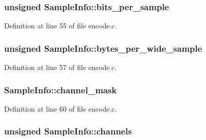 \subsubsection[{\texorpdfstring{bits\+\_\+per\+\_\+sample}{bits_per_sample}}]{\setlength{\rightskip}{0pt plus 5cm}unsigned Sample\+Info\+::bits\+\_\+per\+\_\+sample}\hypertarget{struct_sample_info_a81cea16f77d5531faa6c5ccd1f03557d}{}\label{struct_sample_info_a81cea16f77d5531faa6c5ccd1f03557d}


Definition at line 55 of file encode.\+c.

\subsubsection[{\texorpdfstring{bytes\+\_\+per\+\_\+wide\+\_\+sample}{bytes_per_wide_sample}}]{\setlength{\rightskip}{0pt plus 5cm}unsigned Sample\+Info\+::bytes\+\_\+per\+\_\+wide\+\_\+sample}\hypertarget{struct_sample_info_aa119c89d126596b5a6e1f334a5424337}{}\label{struct_sample_info_aa119c89d126596b5a6e1f334a5424337}


Definition at line 57 of file encode.\+c.

\subsubsection[{\texorpdfstring{channel\+\_\+mask}{channel_mask}}]{ Sample\+Info\+::channel\+\_\+mask}\hypertarget{struct_sample_info_ae709550399925e097e2db55005bf1220}{}\label{struct_sample_info_ae709550399925e097e2db55005bf1220}


Definition at line 60 of file encode.\+c.

\subsubsection[{\texorpdfstring{channels}{channels}}]{\setlength{\rightskip}{0pt plus 5cm}unsigned Sample\+Info\+::channels}\hypertarget{struct_sample_info_ac45ab41db76f3c00da8f251688c4ef61}{}\label{struct_sample_info_ac45ab41db76f3c00da8f251688c4ef61}


